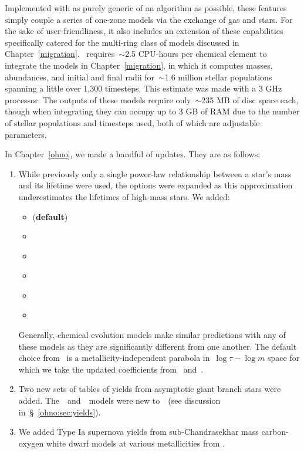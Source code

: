 \documentclass[main.tex]{subfiles}
\begin{document}
Implemented with as purely generic of an algorithm as possible, these features
simply couple a series of one-zone models via the exchange of gas and stars.
For the sake of user-friendliness, it also includes an extension of these
capabilities specifically catered for the multi-ring class of models discussed
in Chapter~\ref{migration}.
\vice~requires~$\sim$2.5 CPU-hours per chemical element to integrate the
models in Chapter~\ref{migration}, in which it computes masses, abundances, and
initial and final radii for~$\sim$1.6 million stellar populations spanning a
little over 1,300 timesteps.
This estimate was made with a 3 GHz processor.
The outputs of these models require only~$\sim$235 MB of disc space each,
though when integrating they can occupy up to 3 GB of RAM due to the number of
stellar populations and timesteps used, both of which are adjustable
parameters.
\par
In Chapter~\ref{ohno}, we made a handful of updates.
They are as follows:
\begin{enumerate}

	\item While previously only a single power-law relationship between a
	star's mass and its lifetime were used, the options were expanded as this
	approximation underestimates the lifetimes of high-mass stars.
	We added:
	\begin{itemize}

		\item \citet{Larson1974} (\textbf{default})
		
		\item \citet{Maeder1989}

		\item \citet{Padovani1993}

		\item \citet{Kodama1997}

		\item \citet{Hurley2000}

		\item \citet{Vincenzo2016b}

	\end{itemize}
	Generally, chemical evolution models make similar predictions with any of
	these models as they are significantly different from one another.
	The default choice from~\citet{Larson1974} is a metallicity-independent
	parabola in~$\log \tau - \log m$ space for which we take the updated
	coefficients from~\citet{Kobayashi2004} and~\citet{David1990}.

	\item Two new sets of tables of yields from asymptotic giant branch stars
	were added.
	The~\karakas~and~\ventura~models were new to~\vice~(see discussion
	in~\S~\ref{ohno:sec:yields}).

	\item We added Type Ia supernova yields from sub-Chandrasekhar mass
	carbon-oxygen white dwarf models at various metallicities from
	\citet{Gronow2021a, Gronow2021b}.

\end{enumerate}
\end{document}
